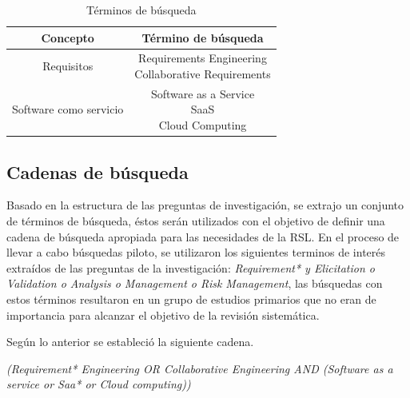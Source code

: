 \documentclass{article}
\begin{document}
\begin{table}[ht]
        \caption{Términos de búsqueda} 
        \centering 
        \begin{tabular}{c c}
                \hline
                Concepto & Término de búsqueda\\ [0.5ex] %
                \hline
                Requisitos             & \makecell{Requirements Engineering \\
                                                   Collaborative Requirements} \\
                \hline 
                Software como servicio & \makecell{Software as a Service \\
                                                   SaaS \\
                                                   Cloud Computing }\\ [1ex]
                \hline 
        \end{tabular}
        \label{table:tablaterminos}
\end{table}
\newpage

\subsection{Cadenas de búsqueda}
Basado en la estructura de las preguntas de investigación, se extrajo un conjunto de 
términos de búsqueda, éstos serán utilizados con el objetivo de definir una cadena de búsqueda apropiada para 
las necesidades de la RSL. 
En el proceso de llevar a cabo búsquedas piloto, se utilizaron los siguientes terminos de interés extraídos de las preguntas de la investigación: 
\emph{Requirement* y Elicitation o Validation o Analysis o Management o Risk Management}, las búsquedas con estos 
términos resultaron en un grupo de estudios primarios que no eran de importancia para alcanzar el objetivo de la 
revisión sistemática. 

Según lo anterior se estableció la siguiente cadena. 

\emph{(Requirement* Engineering OR Collaborative Engineering AND (Software as a service or Saa* or Cloud computing))}
\end{document}
